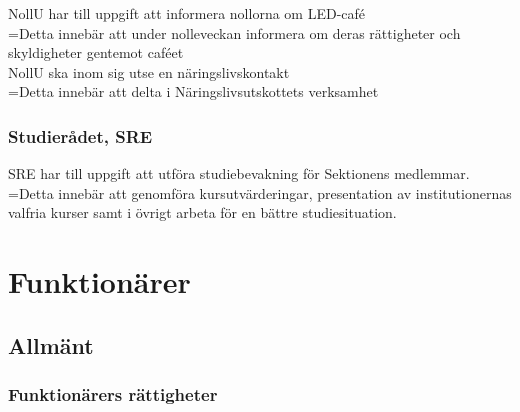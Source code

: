 \documentclass[10pt]{article}
\begin{document}
\noindent NollU har till uppgift att informera nollorna om LED-café\\

\hangindent=\parindent Detta innebär att under nolleveckan informera om
deras rättigheter och skyldigheter gentemot caféet \\

\noindent NollU ska inom sig utse en näringslivskontakt\\

\hangindent=\parindent Detta innebär att delta i Näringslivsutskottets verksamhet

\subsubsection{Studierådet, SRE}

SRE har till uppgift att utföra studiebevakning för Sektionens medlemmar. \\

\hangindent=\parindent Detta innebär att genomföra kursutvärderingar,
presentation av institutionernas valfria kurser samt i övrigt arbeta
för en bättre studiesituation.

\section{Funktionärer}

\subsection{Allmänt}

\subsubsection{Funktionärers rättigheter}
\end{document}
